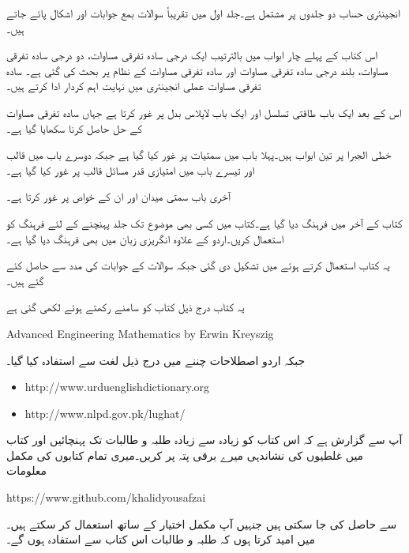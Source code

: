 انجینئری حساب دو جلدوں پر مشتمل ہے۔جلد اول میں تقریباً  سوالات بمع جوابات اور  اشکال  پائے جاتے ہیں۔

اس کتاب کے پہلے چار ابواب میں بالترتیب ایک درجی سادہ تفرقی مساوات، دو درجی سادہ تفرقی مساوات، بلند درجی سادہ تفرقی مساوات  اور سادہ تفرقی مساوات کے نظام پر بحث  کی گئی ہے۔ سادہ تفرقی مساوات عملی انجینئری میں نہایت اہم کردار ادا کرتے ہیں۔ 

اس  کے بعد ایک باب طاقتی تسلسل اور ایک باب لاپلاس بدل پر  غور کرتا ہے جہاں سادہ تفرقی مساوات کے حل حاصل کرنا سکھایا گیا ہے۔ 

خطی الجبرا پر تین ابواب ہیں۔پہلا باب میں سمتیات پر غور کیا گیا ہے جبکہ دوسرے باب میں قالب اور تیسرے باب میں امتیازی قدر مسائل قالب پر غور کیا گیا ہے۔

آخری باب سمتی میدان اور ان کے خواص پر غور کرتا ہے۔ 

کتاب کے آخر میں فرہنگ دیا گیا ہے۔کتاب میں کسی بھی موضوع تک جلد پہنچنے کے لئے فرہنگ کو استعمال کریں۔اردو کے علاوہ انگریزی زبان میں بھی فرہنگ دیا گیا ہے۔

یہ کتاب  استعمال کرتے ہوئے  میں تشکیل دی گئی جبکہ سوالات کے جوابات  کی مدد سے حاصل کئے گئے ہیں۔

یہ کتاب درج ذیل کتاب کو سامنے رکھتے ہوئے لکھی گئی ہے

{
\begin{otherlanguage}{english}
Advanced Engineering Mathematics by Erwin Kreyszig
\end{otherlanguage}
}

جبکہ اردو اصطلاحات چننے میں درج ذیل لغت سے استفادہ  کیا گیا۔
{
\begin{otherlanguage}{english}
\begin{itemize}
\item
http:/\!\!/www.urduenglishdictionary.org
\item
http:/\!\!/www.nlpd.gov.pk/lughat/
\end{itemize}
\end{otherlanguage}
}
آپ سے گزارش ہے کہ اس کتاب کو زیادہ سے زیادہ طلبہ و طالبات تک پہنچائیں اور کتاب میں غلطیوں کی نشاندہی میرے  برقی پتہ پر کریں۔میری تمام کتابوں کی مکمل  معلومات

{
\begin{otherlanguage}{english}
https:/\!\!/www.github.com/khalidyousafzai
\end{otherlanguage}
}

سے حاصل کی جا سکتی ہیں جنہیں آپ مکمل اختیار کے ساتھ استعمال کر سکتے ہیں۔میں امید کرتا ہوں کہ طلبہ و طالبات اس کتاب سے استفادہ ہوں گے۔
\vspace{5mm}

{}


